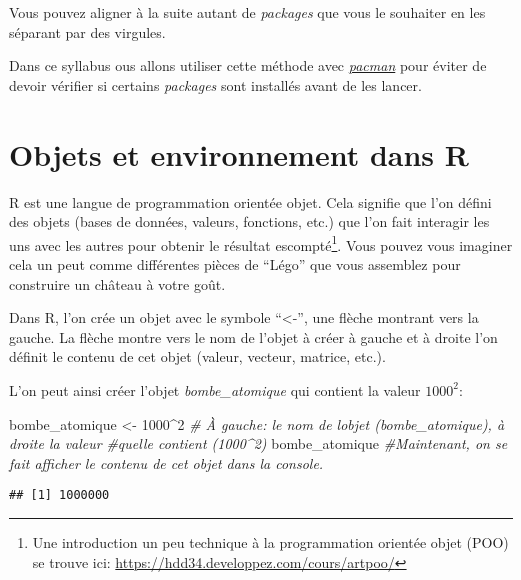\documentclass[
]{book}
\newenvironment{Shaded}{\begin{snugshade}}{\end{snugshade}}
\newcommand{\CommentTok}[1]{\textcolor[rgb]{0.56,0.35,0.01}{\textit{#1}}}
\newcommand{\DecValTok}[1]{\textcolor[rgb]{0.00,0.00,0.81}{#1}}
\newcommand{\NormalTok}[1]{#1}
\newcommand{\OtherTok}[1]{\textcolor[rgb]{0.56,0.35,0.01}{#1}}
\newcommand{\SpecialCharTok}[1]{\textcolor[rgb]{0.00,0.00,0.00}{#1}}
\begin{document}
Vous pouvez aligner à la suite autant de \emph{packages} que vous le souhaiter en les séparant par des virgules.

Dans ce syllabus ous allons utiliser cette méthode avec \href{http://trinker.github.io/pacman/vignettes/Introduction_to_pacman.html}{\emph{pacman}} pour éviter de devoir vérifier si certains \emph{packages} sont installés avant de les lancer.

\hypertarget{objets_envir}{%
\section{Objets et environnement dans R}\label{objets_envir}}

R est une langue de programmation orientée objet. Cela signifie que l'on défini des objets (bases de données, valeurs, fonctions, etc.) que l'on fait interagir les uns avec les autres pour obtenir le résultat escompté\footnote{Une introduction un peu technique à la programmation orientée objet (POO) se trouve ici: \url{https://hdd34.developpez.com/cours/artpoo/}}. Vous pouvez vous imaginer cela un peut comme différentes pièces de ``Légo'' que vous assemblez pour construire un château à votre goût.

Dans R, l'on crée un objet avec le symbole ``\textless-'', une flèche montrant vers la gauche. La flèche montre vers le nom de l'objet à créer à gauche et à droite l'on définit le contenu de cet objet (valeur, vecteur, matrice, etc.).

L'on peut ainsi créer l'objet \emph{bombe\_atomique} qui contient la valeur \(1000^2\):

\begin{Shaded}
\begin{Highlighting}[]
\NormalTok{bombe\_atomique }\OtherTok{\textless{}{-}} \DecValTok{1000}\SpecialCharTok{\^{}}\DecValTok{2} \CommentTok{\# À gauche: le nom de l\textquotesingle{}objet (bombe\_atomique), à droite la valeur}
                         \CommentTok{\#qu\textquotesingle{}elle contient (1000\^{}2)}
\NormalTok{bombe\_atomique           }\CommentTok{\#Maintenant, on se fait afficher le contenu de cet objet dans la console.}
\end{Highlighting}
\end{Shaded}

\begin{verbatim}
## [1] 1000000
\end{verbatim}
\end{document}

